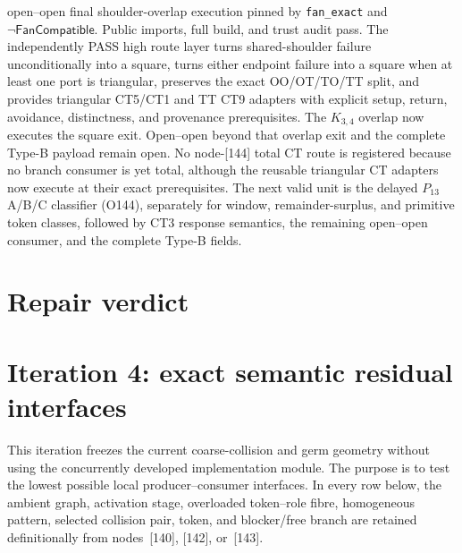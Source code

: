 \documentclass[11pt]{article}
\begin{document}
open--open final shoulder-overlap execution pinned by \texttt{fan\_exact} and
$\neg\mathsf{FanCompatible}$.  Public imports, full build, and trust audit
pass.  The independently PASS high route layer turns shared-shoulder failure
unconditionally into a square, turns either endpoint failure into a square
when at least one port is triangular, preserves the exact OO/OT/TO/TT split,
and provides triangular CT5/CT1 and TT CT9 adapters with explicit setup,
return, avoidance, distinctness, and provenance prerequisites.  The $K_{3,4}$
overlap now executes the square exit.  Open--open beyond that overlap exit and
the complete Type-B payload remain open.
No node-[144] total CT route is registered because no branch consumer is yet
total, although the reusable triangular CT adapters now execute at their exact
prerequisites.  The
next valid unit is the delayed $P_{13}$ A/B/C classifier (O144), separately for
window, remainder-surplus, and primitive token classes, followed by CT3
response semantics, the remaining open--open consumer, and the complete Type-B
fields.

\section{Repair verdict}

\section{Iteration 4: exact semantic residual interfaces}

This iteration freezes the current coarse-collision and germ geometry without
using the concurrently developed implementation module.  The purpose is to
test the lowest possible local producer--consumer interfaces.  In every row
below, the ambient graph, activation stage, overloaded token--role fibre,
homogeneous pattern, selected collision pair, token, and blocker/free branch
are retained definitionally from nodes~[140], [142], or~[143].
\end{document}
